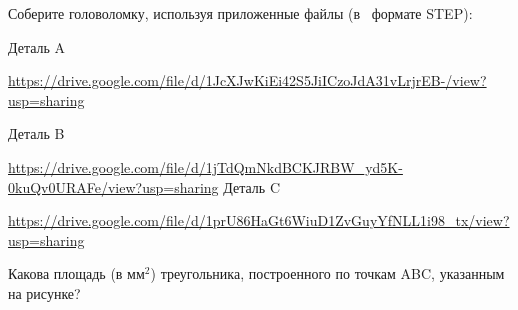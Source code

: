 
Соберите головоломку, используя приложенные файлы (в  формате STEP):

Деталь A

\url{https://drive.google.com/file/d/1JcXJwKiEi42S5JiICzoJdA31vLrjrEB-/view?usp=sharing}

Деталь B

\url{https://drive.google.com/file/d/1jTdQmNkdBCKJRBW_yd5K-0kuQv0URAFe/view?usp=sharing}
Деталь C

\url{https://drive.google.com/file/d/1prU86HaGt6WiuD1ZvGuyYfNLL1i98_tx/view?usp=sharing}


Какова площадь (в мм$^2$) треугольника, построенного по точкам ABC, указанным на рисунке?

